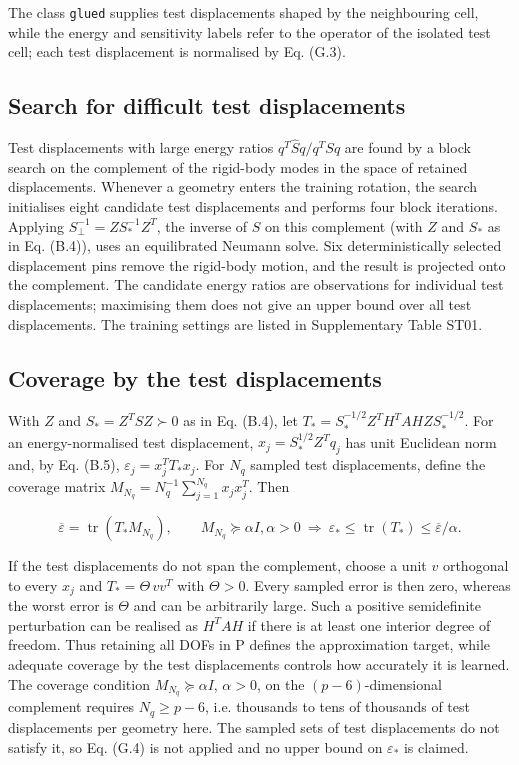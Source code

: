 \documentclass[preprint,12pt,authoryear]{elsarticle}
\begin{document}
The class \texttt{glued} supplies test displacements shaped by the neighbouring cell, while the energy and sensitivity labels refer to the operator of the isolated test cell; each test displacement is normalised by Eq. (G.3).

\subsection{Search for difficult test displacements}

Test displacements with large energy ratios \(q^T\widehat Sq/q^TSq\) are found by a block search on the complement of the rigid-body modes in the space of retained displacements. Whenever a geometry enters the training rotation, the search initialises eight candidate test displacements and performs four block iterations. Applying \(S^{-1}_{\perp}=ZS_*^{-1}Z^T\), the inverse of \(S\) on this complement (with \(Z\) and \(S_*\) as in Eq. (B.4)), uses an equilibrated Neumann solve. Six deterministically selected displacement pins remove the rigid-body motion, and the result is projected onto the complement. The candidate energy ratios are observations for individual test displacements; maximising them does not give an upper bound over all test displacements. The training settings are listed in Supplementary Table ST01.

\subsection{Coverage by the test displacements}

With \(Z\) and \(S_*=Z^TSZ\succ0\) as in Eq. (B.4), let
\(T_*=S_*^{-1/2}Z^TH^TAHZ S_*^{-1/2}\).
For an energy-normalised test displacement, \(x_j=S_*^{1/2}Z^Tq_j\) has unit Euclidean norm and, by Eq. (B.5), \(\varepsilon_j=x_j^TT_*x_j\). For \(N_q\) sampled test displacements, define the coverage matrix \(M_{N_q}=N_q^{-1}\sum_{j=1}^{N_q}x_jx_j^T\). Then

\[
\overline\varepsilon=\operatorname{tr}(T_*M_{N_q}),\qquad
M_{N_q}\succeq\alpha I, \alpha>0
\ \Longrightarrow\ 
\varepsilon_*\le\operatorname{tr}(T_*)\le\overline\varepsilon/\alpha.
\tag{G.4}
\]

If the test displacements do not span the complement, choose a unit \(v\) orthogonal to every \(x_j\) and \(T_*=\Theta\,vv^T\) with \(\Theta>0\). Every sampled error is then zero, whereas the worst error is \(\Theta\) and can be arbitrarily large. Such a positive semidefinite perturbation can be realised as \(H^TAH\) if there is at least one interior degree of freedom. Thus retaining all DOFs in P defines the approximation target, while adequate coverage by the test displacements controls how accurately it is learned. The coverage condition \(M_{N_q}\succeq\alpha I\), \(\alpha>0\), on the \((p-6)\)-dimensional complement requires \(N_q\ge p-6\), i.e. thousands to tens of thousands of test displacements per geometry here. The sampled sets of test displacements do not satisfy it, so Eq. (G.4) is not applied and no upper bound on \(\varepsilon_*\) is claimed.
\end{document}

